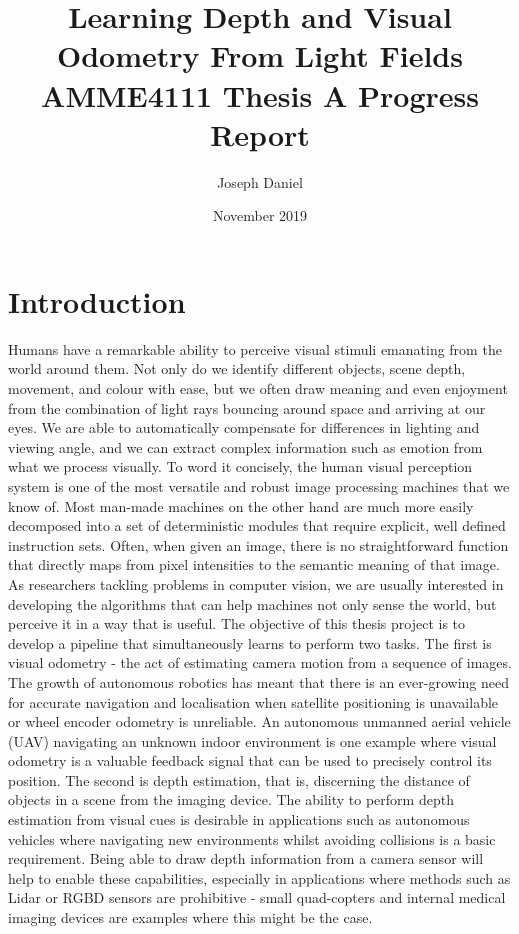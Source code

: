 \documentclass[openany]{book}
\title{Learning Depth and Visual Odometry From Light Fields \\
\large AMME4111 Thesis A Progress Report}
\author{Joseph Daniel}
\date{November 2019}
\begin{document}
\maketitle

\tableofcontents

\chapter{Introduction}
Humans have a remarkable ability to perceive visual stimuli emanating from the world around them. Not only do we identify different objects, scene depth, movement, and colour with ease, but we often draw meaning and even enjoyment from the combination of light rays bouncing around space and arriving at our eyes. We are able to automatically compensate for differences in lighting and viewing angle, and we can extract complex information such as emotion from what we process visually. To word it concisely, the human visual perception system is one of the most versatile and robust image processing machines that we know of. Most man-made machines on the other hand are much more easily decomposed into a set of deterministic modules that require explicit, well defined instruction sets. Often, when given an image, there is no straightforward function that directly maps from pixel intensities to the semantic meaning of that image. As researchers tackling problems in computer vision, we are usually interested in developing the algorithms that can help machines not only sense the world, but perceive it in a way that is useful. The objective of this thesis project is to develop a pipeline that simultaneously learns to perform two tasks. The first is visual odometry - the act of estimating camera motion from a sequence of images. The growth of autonomous robotics has meant that there is an ever-growing need for accurate navigation and localisation when satellite positioning is unavailable or wheel encoder odometry is unreliable. An autonomous unmanned aerial vehicle (UAV) navigating an unknown indoor environment is one example where visual odometry is a valuable feedback signal that can be used to precisely control its position. The second is depth estimation, that is, discerning the distance of objects in a scene from the imaging device. The ability to perform depth estimation from visual cues is desirable in applications such as autonomous vehicles where navigating new environments whilst avoiding collisions is a basic requirement. Being able to draw depth information from a camera sensor will help to enable these capabilities, especially in applications where methods such as Lidar or RGBD sensors are prohibitive - small quad-copters and internal medical imaging devices are examples where this might be the case.
\end{document}
